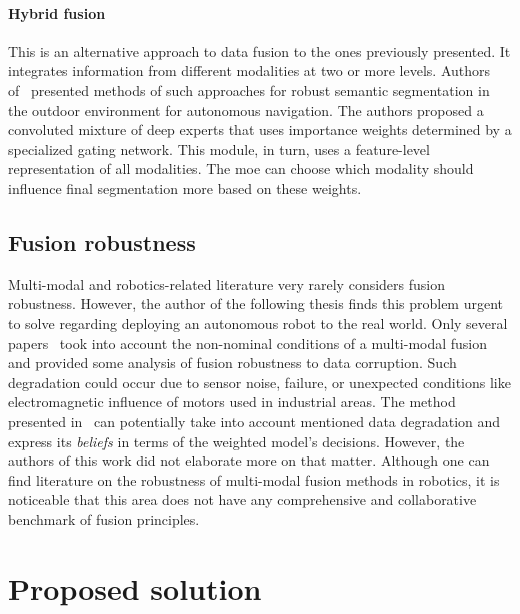 \documentclass[a4paper, 10pt, twoside]{report}
\begin{document}
\paragraph{Hybrid fusion} This is an alternative approach to data fusion to the ones previously presented. It integrates information from different modalities at two or more levels. Authors of~\cite{late_supervised, late_supervised_applied} presented methods of such approaches for robust semantic segmentation in the outdoor environment for autonomous navigation. The authors proposed a convoluted mixture of deep experts that uses importance weights determined by a specialized gating network. This module, in turn, uses a feature-level representation of all modalities. The \acrfull{moe} can choose which modality should influence final segmentation more based on these weights.

\subsection{Fusion robustness}
\label{part:methods:fusion:rw:robustness}

Multi-modal and robotics-related literature very rarely considers fusion robustness. However, the author of the following thesis finds this problem urgent to solve regarding deploying an autonomous robot to the real world. Only several papers~\cite{mid_robust, late_uno, robust_gating, robust_lel, robust_pedestrians, robust_ugv} took into account the non-nominal conditions of a multi-modal fusion and provided some analysis of fusion robustness to data corruption. Such degradation could occur due to sensor noise, failure, or unexpected conditions like \eg electromagnetic influence of motors used in industrial areas. The method presented in~\cite{late_supervised} can potentially take into account mentioned data degradation and express its \textit{beliefs} in terms of the weighted model's decisions. However, the authors of this work did not elaborate more on that matter. Although one can find literature on the robustness of multi-modal fusion methods in robotics, it is noticeable that this area does not have any comprehensive and collaborative benchmark of fusion principles. 

\section{Proposed solution}
\label{part:methods:fusion:solution}
\end{document}
